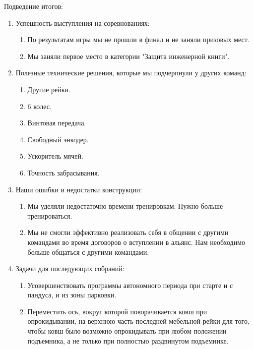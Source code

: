 Подведение итогов:
\begin{enumerate}
  \item Успешность выступления на соревнованиях:
  \begin{enumerate}
	\item По результатам игры мы не прошли в финал и не заняли призовых мест.
	
	\item Мы заняли первое место в категории "Защита инженерной книги".
	
  \end{enumerate}
  
  \item Полезные технические решения, которые мы подчерпнули у других команд:
  \begin{enumerate}
	\item Другие рейки.
	
	\item 6 колес.
	
	\item Винтовая передача.
	
	\item Свободный энкодер.
	
	\item Ускоритель мячей.
	
	\item Точность забрасывания.
	
  \end{enumerate}
  
  \item Наши ошибки и недостатки конструкции:
  \begin{enumerate}
  	\item Мы уделяли недостаточно времени тренировкам. Нужно больше тренироваться.
  	
  	\item Мы не смогли эффективно реализовать себя в общении с другими командами во время договоров о вступлении в альянс. Нам необходимо больше общаться с другими командами.
  	
  \end{enumerate}
  
  \item Задачи для последующих собраний:
  \begin{enumerate}
  	\item Усовершенствовать программы автономного периода при старте и с пандуса, и из зоны парковки.
  	
  	\item Переместить ось, вокруг которой поворачивается ковш при опрокидывании, на верхнюю часть последней мебельной рейки для того, чтобы ковш было возможно опрокидывать при любом положении подъемника, а не только при полностью раздвинутом подъемнике.
  	

\end{enumerate}
\end{enumerate}
